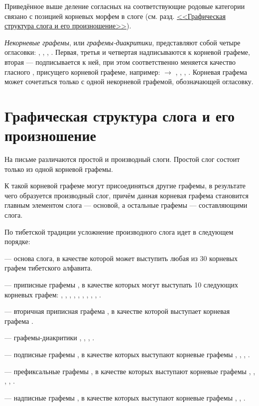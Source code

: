 Приведённое выше деление согласных на соответствующие родовые категории связано с позицией корневых морфем в слоге (см. разд. \hyperref[sec:gss]{<<Графическая структура слога и его произношение>>}).

\emph{Некорневые графемы}, или \emph{графемы-диакритики}, представляют собой четыре огласовки: , , , . Первая, третья и четвертая надписываются к корневой графеме, вторая --- подписывается к ней, при этом соответственно меняется качество гласного , присущего корневой графеме, например:  $\rightarrow$ , , , . Корневая графема может сочетаться только с одной некорневой графемой, обозначающей огласовку.

\section{Графическая структура слога и его произношение}
\label{sec:gss}

На письме различаются простой и производный слоги. Простой слог состоит только из одной корневой графемы.

К такой корневой графеме могут присоединяться другие графемы, в результате чего образуется производный слог, причём данная корневая графема становится главным элементом слога --- основой, а остальные графемы --- составляющими слога.

По тибетской традиции усложнение производного слога идет в следующем порядке:
\begin{description}
	\item {} --- основа слога, в качестве которой может выступить любая из 30 корневых графем тибетского алфавита.
	\item {} --- приписные графемы , в качестве которых могут выступать 10 следующих корневых графем: , , , , , , , , , .
	\item {} --- вторичная приписная графема , в качестве которой выступает корневая графема .
	\item {} --- графемы-диакритики , , , .
	\item {} --- подписные графемы , в качестве которых выступают корневые графемы , , , .
	\item {} --- префиксальные графемы , в качестве которых выступают корневые графемы , , , , .
	\item {} --- надписные графемы , в качестве которых выступают корневые графемы , , .
\end{description}

